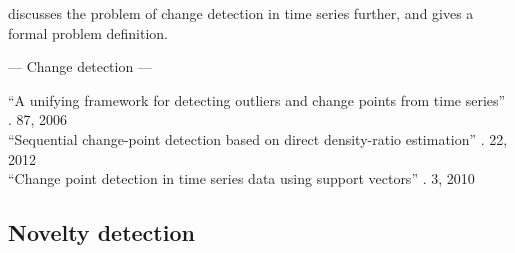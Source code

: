  discusses the problem of change detection in time series further, and gives a formal problem definition.



--- Change detection ---

``A unifying framework for detecting outliers and change points from time series'' \cite{takeuchi2006unifying}. 87, 2006 \\







``Sequential change-point detection based on direct density-ratio estimation'' \cite{kawahara2012sequential}. 22, 2012 \\

``Change point detection in time series data using support vectors'' \cite{camci2010change}. 3, 2010 \\

\subsection{Novelty detection}\label{subsec:novelty_detection}

